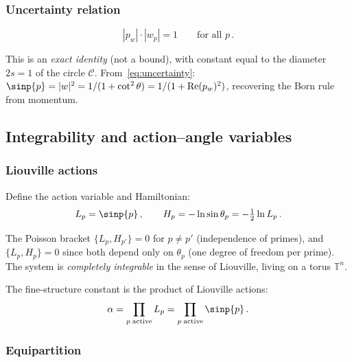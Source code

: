 \documentclass[12pt,a4paper]{article}
\begin{document}
\subsubsection{Uncertainty relation}
\label{subsec:cx_uncertainty}

\begin{equation}
  |p_w| \cdot |w_p| = 1 \qquad\text{for all } p\,.
  \label{eq:uncertainty}
\end{equation}

This is an \emph{exact identity} (not a bound), with constant equal
to the diameter $2s = 1$ of the circle $\mathcal{C}$.
From~\eqref{eq:uncertainty}: $\sinp{p} = |w|^2 = 1/(1 + \cot^2\theta)
= 1/(1 + \mathrm{Re}(p_w)^2)$, recovering the Born rule from momentum.


\subsection{Integrability and action--angle variables}
\label{sec:cx_integrability}

\subsubsection{Liouville actions}

Define the action variable and Hamiltonian:
\begin{equation}
  L_p = \sinp{p}\,,\qquad
  H_p = -\ln\sin\theta_p = -\tfrac{1}{2}\ln L_p\,.
  \label{eq:liouville}
\end{equation}

The Poisson bracket $\{L_p, H_{p'}\} = 0$ for $p \neq p'$ (independence
of primes), and $\{L_p, H_p\} = 0$ since both depend only on $\theta_p$
(one degree of freedom per prime). The system is \emph{completely integrable}
in the sense of Liouville, living on a torus $\mathbb{T}^n$.

The fine-structure constant is the product of Liouville actions:
\begin{equation}
  \alpha = \prod_{p\;\mathrm{active}} L_p
  = \prod_{p\;\mathrm{active}} \sinp{p}\,.
  \label{eq:alpha_liouville}
\end{equation}

\subsubsection{Equipartition}
\label{subsec:cx_equipartition}
\end{document}
